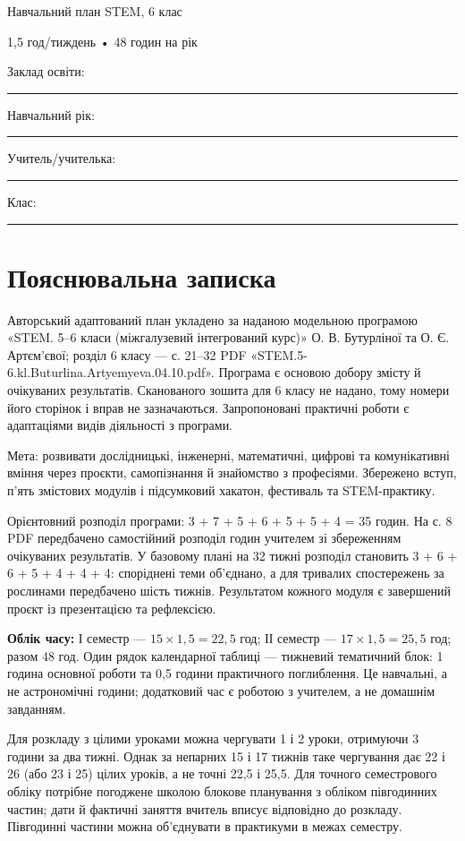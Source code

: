 \documentclass[10pt,a4paper,landscape]{article}
\begin{document}
{\LARGE\color{accent} Навчальний план STEM, 6 клас}

{\large 1,5 год/тиждень • 48 годин на рік}

Заклад освіти: \rule{90mm}{0.3pt}\quad Навчальний рік: \rule{30mm}{0.3pt}

Учитель/учителька: \rule{95mm}{0.3pt}\quad Клас: \rule{25mm}{0.3pt}
\section*{Пояснювальна записка}
Авторський адаптований план укладено за наданою модельною програмою «STEM. 5--6 класи (міжгалузевий інтегрований курс)» О. В. Бутурліної та О. Є. Артєм’євої; розділ 6 класу — с. 21--32 PDF «STEM.5-6.kl.Buturlina.Artyemyeva.04.10.pdf». Програма є основою добору змісту й очікуваних результатів. Сканованого зошита для 6 класу не надано, тому номери його сторінок і вправ не зазначаються. Запропоновані практичні роботи є адаптаціями видів діяльності з програми.

Мета: розвивати дослідницькі, інженерні, математичні, цифрові та комунікативні вміння через проєкти, самопізнання й знайомство з професіями. Збережено вступ, п’ять змістових модулів і підсумковий хакатон, фестиваль та STEM-практику.

Орієнтовний розподіл програми: 3 + 7 + 5 + 6 + 5 + 5 + 4 = 35 годин. На с. 8 PDF передбачено самостійний розподіл годин учителем зі збереженням очікуваних результатів. У базовому плані на 32 тижні розподіл становить 3 + 6 + 6 + 5 + 4 + 4 + 4: споріднені теми об’єднано, а для тривалих спостережень за рослинами передбачено шість тижнів. Результатом кожного модуля є завершений проєкт із презентацією та рефлексією.

\textbf{Облік часу:}  І семестр — $15\times1{,}5=22{,}5$ год; ІІ семестр — $17\times1{,}5=25{,}5$ год; разом 48 год. Один рядок календарної таблиці — тижневий тематичний блок: 1 година основної роботи та 0,5 години практичного поглиблення. Це навчальні, а не астрономічні години; додатковий час є роботою з учителем, а не домашнім завданням.

Для розкладу з цілими уроками можна чергувати 1 і 2 уроки, отримуючи 3 години за два тижні. Однак за непарних 15 і 17 тижнів таке чергування дає 22 і 26 (або 23 і 25) цілих уроків, а не точні 22,5 і 25,5. Для точного семестрового обліку потрібне погоджене школою блокове планування з обліком півгодинних частин; дати й фактичні заняття вчитель вписує відповідно до розкладу. Півгодинні частини можна об’єднувати в практикуми в межах семестру.
\end{document}
